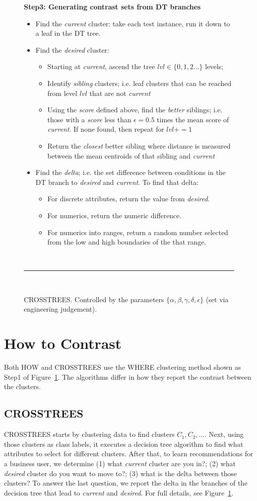\documentclass[conference]{IEEEtran}
\newcommand{\bi}{\begin{itemize}}
\newcommand{\ei}{\end{itemize}}
\newcommand{\fig}[1]{Figure~\ref{fig:#1}}
\begin{document}
\begin{figure}[t]
		{\bf Step3: Generating contrast sets from DT branches}
		\begin{itemize}
		\item Find the {\em current } cluster: take each test instance, run it down to a leaf in the DT tree.  
		\item Find the {\em desired} cluster: 
		\bi
		\item Starting at {\em current}, ascend the tree $lvl\in \{0,1,2...\}$ levels;
		\item Identify {\em sibling} clusters; i.e. leaf clusters that can be reached from level $lvl$ that are not {\em current }
		\item Using the {\em score} defined above, find the {\em better} siblings; i.e. those with a {\em score} less than $\epsilon=0.5$ times the mean score of {\em current}. If none found, then repeat for $lvl += 1$
		\item  Return the {\em closest} better sibling where distance is measured between the mean centroids of that sibling and {\em current}
		\ei
		\item Find the {\em delta}; i.e. the set difference between  conditions in the DT branch to {\em desired} and {\em current}. To find that delta:
		\bi
		\item
		For discrete attributes,  return the value from {\em desired}. 
		\item
		For  numerics, return the numeric difference. 
		\item
		For numerics  into ranges, return a random number selected from the low and high boundaries of the that range.
	\ei
	\ei
		~\hrule~
		\caption{CROSSTREES. Controlled by the parameters
		$\{\alpha, \beta, \gamma, \delta, \epsilon\}$ (set via engineering judgement).}
		\label{fig:contast_trees}
	\end{figure}
	
	\section{How to Contrast}
Both HOW and CROSSTREES use the WHERE clustering method shown as Step1 of \fig{contast_trees}. The algorithms differ in how they report the contrast between the clusters.
	
		\subsection{ CROSSTREES}

	CROSSTREES starts by clustering data to find clusters $C_1,C_2,...$.
	Next, using those clusters as class labels, it executes a decision tree algorithm to find what attributes to select for different clusters. After that, to learn recommendations for a business user, we determine (1) what {\em current} cluster are you in?; (2) what {\em desired} cluster do you want to move to?; (3) what is the delta between those clusters? To answer the last question, we report the delta in the branches of the decision tree that lead to {\em current} and {\em desired}.  For full details, see \fig{contast_trees}.
	
\end{document}
